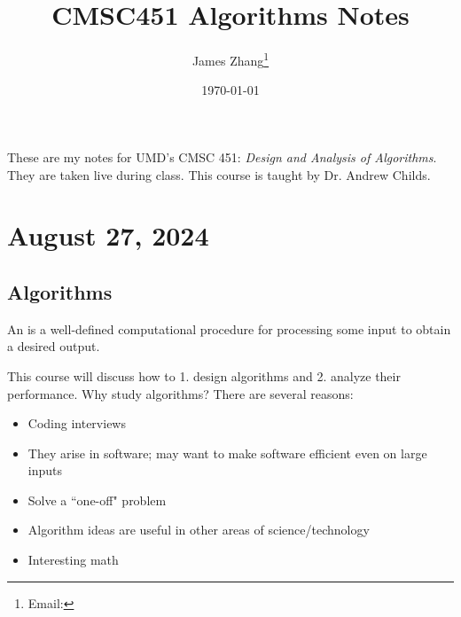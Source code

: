 \documentclass[12pt]{scrartcl}
\begin{document}
\title{CMSC451 Algorithms Notes}
\author{James Zhang\thanks{Email: }}
\date{\today}



\maketitle
These are my notes for UMD's CMSC 451: \textit{Design and Analysis of Algorithms}. They are taken live during class. This course is taught by Dr. Andrew Childs.
\tableofcontents
\newpage

\section{August 27, 2024}
\subsection{Algorithms}
\begin{definition}
    An  is a well-defined computational procedure for processing some input to obtain a desired output.
\end{definition}

This course will discuss how to 1. design algorithms and 2. analyze their performance. Why study algorithms? There are several reasons:
    \begin{itemize}
        \item Coding interviews
        \item They arise in software; may want to make software efficient even on large inputs
        \item Solve a ``one-off" problem
        \item Algorithm ideas are useful in other areas of science/technology
        \item Interesting math
    \end{itemize}
\end{document}
